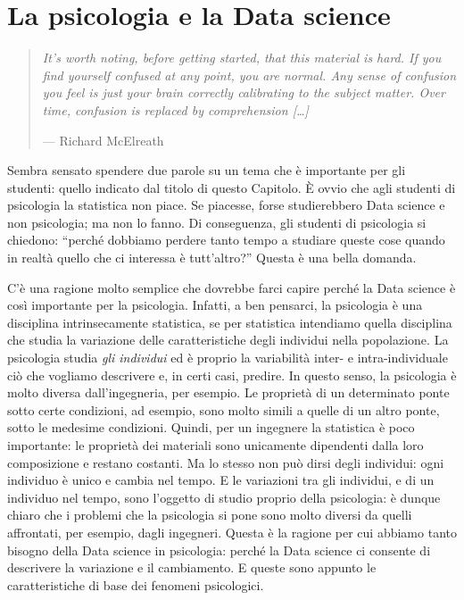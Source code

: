 \documentclass[
  10pt,
  italian,
  a4paper,
  extrafontsizes,onecolumn,openright
  ]{memoir}
\begin{document}
\hypertarget{la-psicologia-e-la-data-science}{%
\section{La psicologia e la Data science}\label{la-psicologia-e-la-data-science}}

\begin{quote}
\emph{It's worth noting, before getting started, that this material is hard. If you find yourself confused at any point, you are normal. Any sense of confusion you feel is just your brain correctly calibrating to the subject matter. Over time, confusion is replaced by comprehension {[}\ldots{]}}

\hfill --- Richard McElreath
\end{quote}

Sembra sensato spendere due parole su un tema che è importante per gli studenti: quello indicato dal titolo di questo Capitolo. È ovvio che agli studenti di psicologia la statistica non piace. Se piacesse, forse studierebbero Data science e non psicologia; ma non lo fanno. Di conseguenza, gli studenti di psicologia si chiedono: ``perché dobbiamo perdere tanto tempo a studiare queste cose quando in realtà quello che ci interessa è tutt'altro?'' Questa è una bella domanda.

C'è una ragione molto semplice che dovrebbe farci capire perché la Data science è così importante per la psicologia. Infatti, a ben pensarci, la psicologia è una disciplina intrinsecamente statistica, se per statistica intendiamo quella disciplina che studia la variazione delle caratteristiche degli individui nella popolazione. La psicologia studia \emph{gli individui} ed è proprio la variabilità inter- e intra-individuale ciò che vogliamo descrivere e, in certi casi, predire. In questo senso, la psicologia è molto diversa dall'ingegneria, per esempio. Le proprietà di un determinato ponte sotto certe condizioni, ad esempio, sono molto simili a quelle di un altro ponte, sotto le medesime condizioni. Quindi, per un ingegnere la statistica è poco importante: le proprietà dei materiali sono unicamente dipendenti dalla loro composizione e restano costanti. Ma lo stesso non può dirsi degli individui: ogni individuo è unico e cambia nel tempo. E le variazioni tra gli individui, e di un individuo nel tempo, sono l'oggetto di studio proprio della psicologia: è dunque chiaro che i problemi che la psicologia si pone sono molto diversi da quelli affrontati, per esempio, dagli ingegneri. Questa è la ragione per cui abbiamo tanto bisogno della Data science in psicologia: perché la Data science ci consente di descrivere la variazione e il cambiamento. E queste sono appunto le caratteristiche di base dei fenomeni psicologici.
\end{document}
